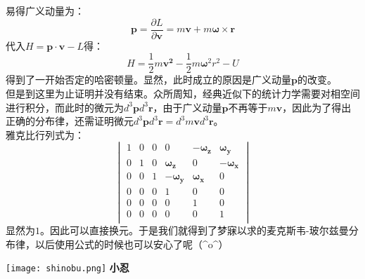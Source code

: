 \documentclass[utf8]{ctexart}
\begin{document}
易得广义动量为：
$$
\boldsymbol{p}=\frac{\partial L}{\partial \boldsymbol{v}}=m\boldsymbol{v}+m\boldsymbol{\omega}\times\boldsymbol{r}
$$
代入$H=\boldsymbol{p}\cdot\boldsymbol{v}-L$得：
$$
H=\frac{1}{2}m\boldsymbol{v^2}-\frac{1}{2}m\boldsymbol{\omega} ^{2}r^2-U
$$
得到了一开始否定的哈密顿量。显然，此时成立的原因是广义动量$\boldsymbol{p}$的改变。\\
但是到这里为止证明并没有结束。众所周知，经典近似下的统计力学需要对相空间进行积分，而此时的微元为$d^3\boldsymbol{p}d^3\boldsymbol{r}$，由于广义动量$\boldsymbol{p}$不再等于$m\boldsymbol{v}$，因此为了得出正确的分布律，还需证明微元$d^3\boldsymbol{p}d^3\boldsymbol{r}=d^3m\boldsymbol{v}d^3\boldsymbol{r}$。\\
雅克比行列式为：
$$
\begin{vmatrix}
	1  &0  &0  &0&-\boldsymbol{\omega_{z}}&\boldsymbol{\omega_{y}}\\
	0  &1  &0  &\boldsymbol{\omega_{z}}&0&-\boldsymbol{\omega_{x}}\\
	0  &0  &1  &-\boldsymbol{\omega_{y}}&\boldsymbol{\omega_{x}}&0\\
	0  &0  &0  &1&0&0\\
	0  &0  &0  &0&1&0\\
	0  &0  &0  &0&0&1\\
\end{vmatrix}
$$
显然为$1$。因此可以直接换元。于是我们就得到了梦寐以求的麦克斯韦-玻尔兹曼分布律，以后使用公式的时候也可以安心了呢（\^{}o\^{}）
\begin{center}
	\texttt{[image: shinobu.png]}
	\textbf{小忍}
\end{center}
\end{document}
